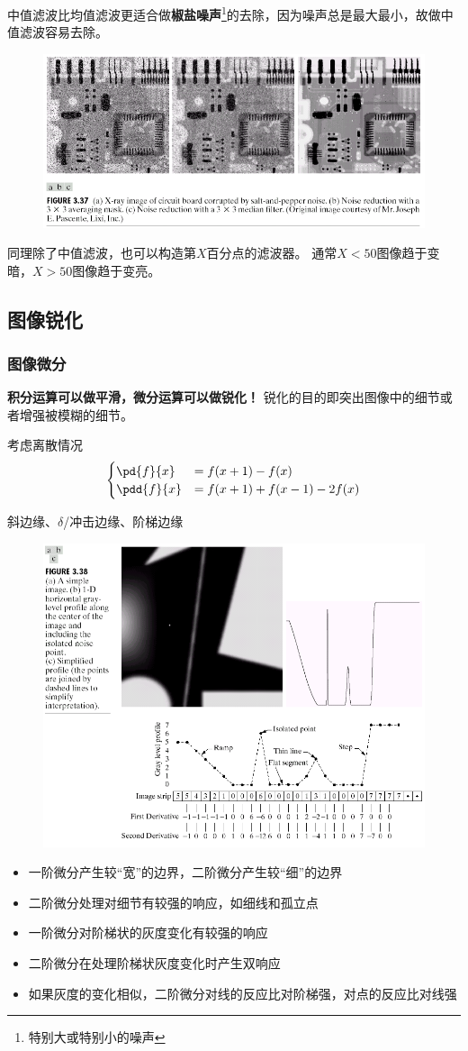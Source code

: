 中值滤波比均值滤波更适合做\textbf{椒盐噪声}\footnote{特别大或特别小的噪声}的去除，因为噪声总是最大最小，故做中值滤波容易去除。
\begin{figure}[H]
\centering
\includegraphics[width=0.8\linewidth]{fig/salt-and-pepper-noise.png}
\end{figure}

同理除了中值滤波，也可以构造第$X$百分点的滤波器。
通常$X<50$图像趋于变暗，$X>50$图像趋于变亮。


\subsection{图像锐化}
\subsubsection{图像微分}
\textbf{积分运算可以做平滑，微分运算可以做锐化！}
锐化的目的即突出图像中的细节或者增强被模糊的细节。

考虑离散情况
\[\begin{cases}
\pd{f}{x}&=f(x+1)-f(x)\\
\pdd{f}{x}&=f(x+1)+f(x-1)-2f(x)
\end{cases}\]

斜边缘、$\delta$/冲击边缘、阶梯边缘
\begin{figure}[H]
\centering
\includegraphics[width=0.6\linewidth]{fig/differential.png}
\end{figure}
\begin{itemize}
\item 一阶微分产生较“宽”的边界，二阶微分产生较“细”的边界
\item 二阶微分处理对细节有较强的响应，如细线和孤立点
\item 一阶微分对阶梯状的灰度变化有较强的响应
\item 二阶微分在处理阶梯状灰度变化时产生双响应
\item 如果灰度的变化相似，二阶微分对线的反应比对阶梯强，对点的反应比对线强
\end{itemize}

